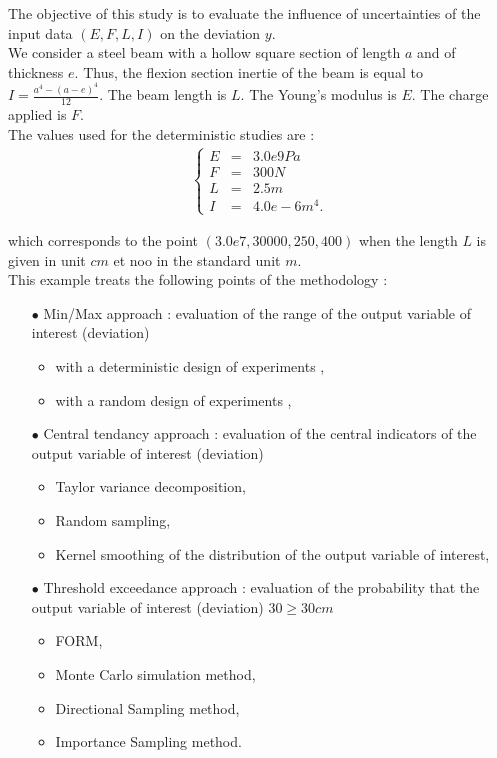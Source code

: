 \documentclass[11pt]{article}
\begin{document}
The objective of this study is to evaluate the influence of uncertainties of the input data $(E, F, L, I)$ on the deviation $y$.\\

We consider a steel beam with a hollow square section of length $a$ and of thickness $e$. Thus, the flexion section inertie of the beam is equal to $I = \displaystyle \frac{a^4 - (a-e)^4}{12}$. The beam length is $L$. The Young's modulus is $E$. The charge applied is $F$.\\

The  values used for the deterministic studies are :
\begin{align*}
  \left\{
  \begin{array}{lcl}
    E & = & 3.0e9 Pa\\
    F & = & 300 N\\
    L & = & 2.5m\\
    I & = & 4.0e-6 m^4.
  \end{array}
  \right.
\end{align*}

which corresponds to the point $(3.0e7, 30000, 250, 400)$ when the length $L$ is given in unit $cm$ et noo in the standard unit $m$.\\


This example treats the following points of the methodology :
\begin{itemize}
\item[$\bullet$] Min/Max approach : evaluation of the range of the output variable of interest (deviation)
  \begin{itemize}
  \item with a deterministic design of experiments ,
  \item with a random design of experiments ,
  \end{itemize}
\item[$\bullet$] Central tendancy approach : evaluation of the central indicators of the output variable of interest (deviation)
  \begin{itemize}
  \item Taylor variance decomposition,
  \item Random sampling,
  \item Kernel smoothing of the distribution of the output variable of interest,
  \end{itemize}
\item[$\bullet$] Threshold exceedance approach : evaluation of the probability that the output variable of interest (deviation) 30$\geq 30cm$
  \begin{itemize}
  \item FORM,
  \item Monte Carlo simulation method,
  \item Directional Sampling method,
  \item Importance Sampling method.
  \end{itemize}
\end{itemize}
\end{document}
